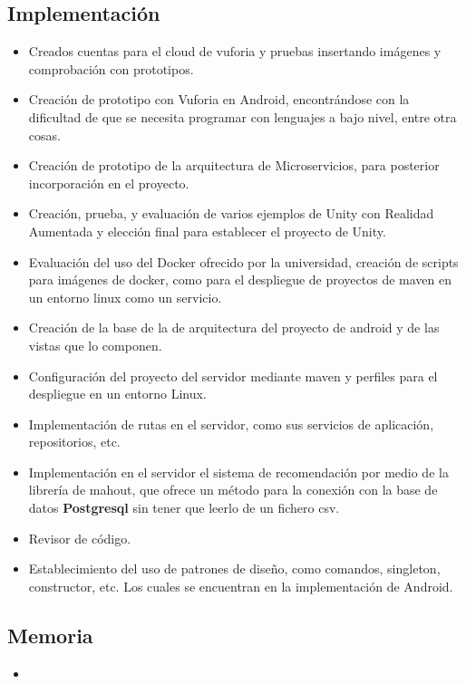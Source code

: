     \subsection{Implementación}
    \label{makereference7.4.3}
        \begin{itemize}  
            \item Creados cuentas para el cloud de vuforia y pruebas insertando imágenes y comprobación con prototipos.
            \item Creación de prototipo con Vuforia en Android, encontrándose con la dificultad de que se necesita programar con lenguajes a bajo nivel, entre otra cosas.
            \item Creación de prototipo de la arquitectura de Microservicios, para posterior incorporación en el proyecto.
            \item Creación, prueba, y evaluación de varios ejemplos de Unity con Realidad Aumentada y elección final para establecer el proyecto de Unity.
            \item Evaluación del uso del Docker ofrecido por la universidad, creación de scripts para imágenes de docker, como para el despliegue de proyectos de maven en un entorno linux como un servicio. 
            \item Creación de la base de la de arquitectura del proyecto de android y de las vistas que lo componen.
            \item Configuración del proyecto del servidor mediante maven y perfiles para el despliegue en un entorno Linux.
            \item Implementación de rutas en el servidor, como sus servicios de aplicación, repositorios, etc.
            \item Implementación en el servidor el sistema de recomendación por medio de la librería de mahout, que ofrece un método para la conexión con la base de datos \textbf{Postgresql} sin tener que leerlo de un fichero csv.
            \item Revisor de código.
            \item Establecimiento del uso de patrones de diseño, como comandos, singleton, constructor, etc. Los cuales se encuentran en la implementación de Android. 
        \end{itemize}
    \subsection{Memoria}
    \label{makereference7.4.3}
        \begin{itemize}
            \item
        \end{itemize}
